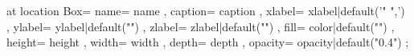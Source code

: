 \pic[shift={ {{- offset -}} }] at {{ location }} {
    Box={
        name={{ name }},
        caption={{ caption }},
        xlabel={{ xlabel|default('{{" ",}}') }},
        ylabel={{ ylabel|default("") }},
        zlabel={{ zlabel|default("") }},
        fill={{ color|default("\ConvColor") }},
        height={{ height }},
        width={{ width }},
        depth={{ depth }},
        opacity={{ opacity|default("0.4") }}
    }
};
